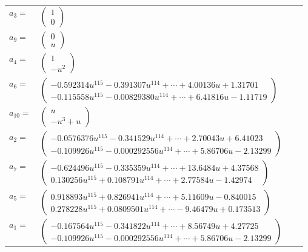 \documentclass[1p]{elsarticle_modified}
\theoremstyle{definition}
\begin{document}
\begin{tabular}{m{7pt} m{180pt} m{7pt} m{180pt} }
\flushright $a_{3}=$&$\begin{pmatrix}1\\0\end{pmatrix}$ \\
\flushright $a_{9}=$&$\begin{pmatrix}0\\u\end{pmatrix}$ \\
\flushright $a_{4}=$&$\begin{pmatrix}1\\- u^2\end{pmatrix}$ \\
\flushright $a_{6}=$&$\begin{pmatrix}-0.592314 u^{115}-0.391307 u^{114}+\cdots+4.00136 u+1.31701\\-0.115558 u^{115}-0.00829380 u^{114}+\cdots+6.41816 u-1.11719\end{pmatrix}$ \\
\flushright $a_{10}=$&$\begin{pmatrix}u\\- u^3+u\end{pmatrix}$ \\
\flushright $a_{2}=$&$\begin{pmatrix}-0.0576376 u^{115}-0.341529 u^{114}+\cdots+2.70043 u+6.41023\\-0.109926 u^{115}-0.000292556 u^{114}+\cdots+5.86706 u-2.13299\end{pmatrix}$ \\
\flushright $a_{7}=$&$\begin{pmatrix}-0.624496 u^{115}-0.335359 u^{114}+\cdots+13.6484 u+4.37568\\0.130256 u^{115}+0.108791 u^{114}+\cdots+2.77584 u-1.42974\end{pmatrix}$ \\
\flushright $a_{5}=$&$\begin{pmatrix}0.918893 u^{115}+0.826941 u^{114}+\cdots+5.11609 u-0.840015\\0.278228 u^{115}+0.0809501 u^{114}+\cdots-9.46479 u+0.173513\end{pmatrix}$ \\
\flushright $a_{1}=$&$\begin{pmatrix}-0.167564 u^{115}-0.341822 u^{114}+\cdots+8.56749 u+4.27725\\-0.109926 u^{115}-0.000292556 u^{114}+\cdots+5.86706 u-2.13299\end{pmatrix}$ \\

\end{tabular}
\end{document}

